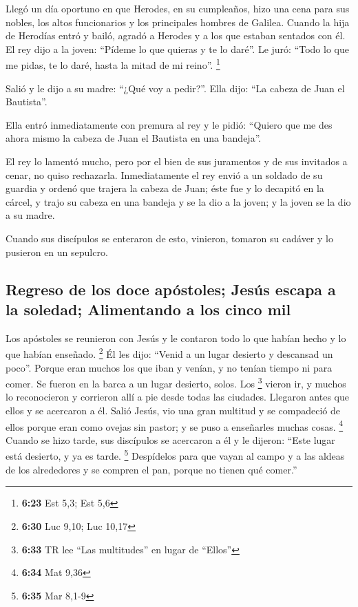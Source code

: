 Llegó un día oportuno en que Herodes, en su cumpleaños,
hizo una cena para sus nobles, los altos funcionarios y los principales
hombres de Galilea.  Cuando la hija de Herodías entró y
bailó, agradó a Herodes y a los que estaban sentados con él. El rey dijo
a la joven: ``Pídeme lo que quieras y te lo daré''.  Le
juró: ``Todo lo que me pidas, te lo daré, hasta la mitad de mi reino''.
\footnote{\textbf{6:23} Est 5,3; Est 5,6}

 Salió y le dijo a su madre: ``¿Qué voy a pedir?''. Ella
dijo: ``La cabeza de Juan el Bautista''.

 Ella entró inmediatamente con premura al rey y le pidió:
``Quiero que me des ahora mismo la cabeza de Juan el Bautista en una
bandeja''.

 El rey lo lamentó mucho, pero por el bien de sus
juramentos y de sus invitados a cenar, no quiso rechazarla.
 Inmediatamente el rey envió a un soldado de su guardia y
ordenó que trajera la cabeza de Juan; éste fue y lo decapitó en la
cárcel,  y trajo su cabeza en una bandeja y se la dio a
la joven; y la joven se la dio a su madre.

 Cuando sus discípulos se enteraron de esto, vinieron,
tomaron su cadáver y lo pusieron en un sepulcro.

\hypertarget{regreso-de-los-doce-apuxf3stoles-jesuxfas-escapa-a-la-soledad-alimentando-a-los-cinco-mil}{%
\subsection{Regreso de los doce apóstoles; Jesús escapa a la soledad;
Alimentando a los cinco
mil}\label{regreso-de-los-doce-apuxf3stoles-jesuxfas-escapa-a-la-soledad-alimentando-a-los-cinco-mil}}

 Los apóstoles se reunieron con Jesús y le contaron todo
lo que habían hecho y lo que habían enseñado. \footnote{\textbf{6:30}
  Luc 9,10; Luc 10,17}  Él les dijo: ``Venid a un lugar
desierto y descansad un poco''. Porque eran muchos los que iban y
venían, y no tenían tiempo ni para comer.  Se fueron en
la barca a un lugar desierto, solos.  Los \footnote{\textbf{6:33}
  TR lee ``Las multitudes'' en lugar de ``Ellos''} vieron ir, y muchos
lo reconocieron y corrieron allí a pie desde todas las ciudades.
Llegaron antes que ellos y se acercaron a él.  Salió
Jesús, vio una gran multitud y se compadeció de ellos porque eran como
ovejas sin pastor; y se puso a enseñarles muchas cosas. \footnote{\textbf{6:34}
  Mat 9,36}  Cuando se hizo tarde, sus discípulos se
acercaron a él y le dijeron: ``Este lugar está desierto, y ya es tarde.
\footnote{\textbf{6:35} Mar 8,1-9}  Despídelos para que
vayan al campo y a las aldeas de los alrededores y se compren el pan,
porque no tienen qué comer.''

